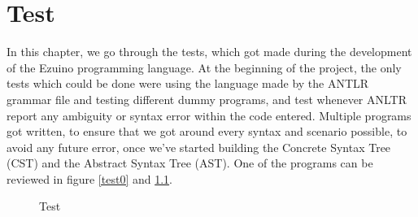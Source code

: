 \chapter{Test}
In this chapter, we go through the tests, which got made during the development of the Ezuino programming language. At the beginning of the project, the only tests which could be done were using the language made by the ANTLR grammar file and testing different dummy programs, and test whenever ANLTR report any ambiguity or syntax error within the code entered. Multiple programs got written, to ensure that we got around every syntax and scenario possible, to avoid any future error, once we’ve started building the Concrete Syntax Tree (CST) and the Abstract Syntax Tree (AST).  One of the programs can be reviewed in figure \ref{test0} and \ref{test00}.

\begin{figure}[H]
\centering
{}
\caption{Test}
\label{test00}
\end{figure}

